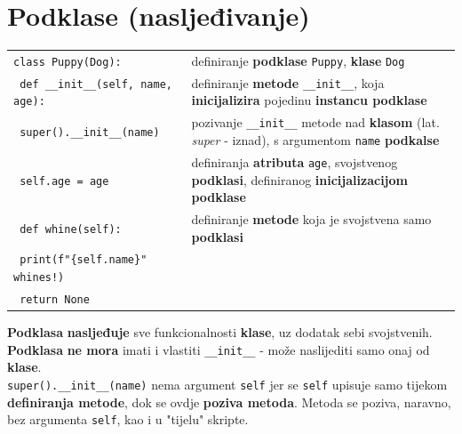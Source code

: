 \documentclass[10pt]{article}
\begin{document}
    \section*{\color{NavyBlue} Podklase (nasljeđivanje)}
    \begin{tabular}{|>{\tt}p{10.00cm}|>{}p{14.50cm}|}
        \hline
        class Puppy(Dog): & definiranje \textbf{podklase} \texttt{Puppy}, \textbf{klase} \texttt{Dog}
        \\
        \hspace{5mm} def \_\_init\_\_(self, name, age): & definiranje \textbf{metode} \texttt{\_\_init\_\_}, koja \textbf{inicijalizira} pojedinu \textbf{instancu podklase}
        \\
        \hspace{5mm} \hspace{5mm} super().\_\_init\_\_(name) & pozivanje \texttt{\_\_init\_\_} metode nad \textbf{klasom} (lat. \textit{super} - iznad), s argumentom \texttt{name} \textbf{podkalse}
        \\
        \hspace{5mm} \hspace{5mm} self.age = age & definiranja \textbf{atributa} \texttt{age}, svojstvenog \textbf{podklasi}, definiranog  \textbf{inicijalizacijom podklase}
        \\
        \hspace{5mm} def whine(self): & definiranje \textbf{metode} koja je svojstvena samo \textbf{podklasi}
        \\
        \hspace{5mm} \hspace{5mm} print(f"\{self.name\}" whines!) &
        \\
        \hspace{5mm} \hspace{5mm} return None &
        \\ \hline
    \end{tabular}
    \begin{center}
        \textbf{Podklasa} \textbf{nasljeđuje} sve funkcionalnosti \textbf{klase}, uz dodatak sebi svojstvenih.
        \\
        \textbf{Podklasa} \textbf{ne mora} imati i vlastiti \texttt{\_\_init\_\_} - može naslijediti samo onaj od \textbf{klase}.
        \\
        \texttt{super().\_\_init\_\_(name)} nema argument \texttt{self} jer se \texttt{self} upisuje samo tijekom \textbf{definiranja metode}, dok se ovdje \textbf{poziva metoda}. Metoda se poziva, naravno, bez argumenta \texttt{self}, kao i u "tijelu" skripte.
    \end{center}
\end{document}
